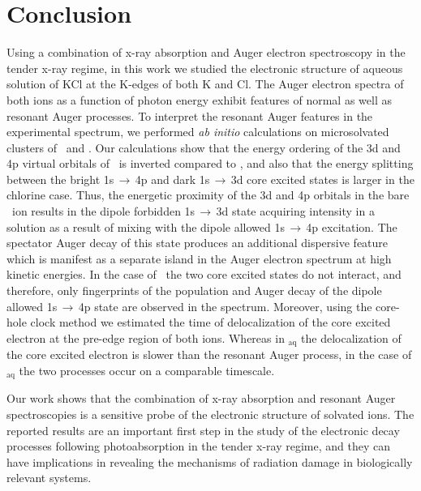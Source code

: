 \section{Conclusion}\label{sec:concl}

Using a combination of x-ray absorption and Auger electron spectroscopy in the tender x-ray regime, in this work we studied the electronic structure of aqueous solution of KCl at the K-edges of both K and Cl. The Auger electron spectra of both ions as a function of photon energy exhibit features of normal as well as resonant Auger processes. To interpret the resonant Auger features in the experimental spectrum, we performed {\it ab initio} calculations on microsolvated clusters of \ki~and \cli. Our calculations show that the energy ordering of the 3d and 4p virtual orbitals of \cli~is inverted compared to \ki, and also that the energy splitting between the bright 1s$\,\rightarrow\,$4p and dark 1s$\,\rightarrow\,$3d core excited states is larger in the chlorine case. Thus, the energetic proximity of the 3d and 4p orbitals in the bare \ki~ion results in the dipole forbidden 1s$\,\rightarrow\,$3d state acquiring intensity in a solution as a result of mixing with the dipole allowed 1s$\,\rightarrow\,$4p excitation. The spectator Auger decay of this state produces an additional dispersive feature which is manifest as a separate island in the Auger electron spectrum at high kinetic energies. In the case of \cli~the two core excited states do not interact, and therefore, only fingerprints of the population and Auger decay of the dipole allowed 1s$\,\rightarrow\,$4p state are observed in the spectrum. Moreover, using the core-hole clock method we estimated the time of delocalization of the core excited electron at the pre-edge region of both ions. Whereas in \ki$_{\text{aq}}$ the delocalization of the core excited electron is slower than the resonant Auger process, in the case of \cli$_{\text{aq}}$ the two processes occur on a comparable timescale.


Our work shows that the combination of x-ray absorption and resonant Auger spectroscopies is a sensitive probe of the electronic structure of solvated ions. The reported results are an important first step in the study of the electronic decay processes following photoabsorption in the tender x-ray regime, and they can have implications in revealing the mechanisms of radiation damage in biologically relevant systems.